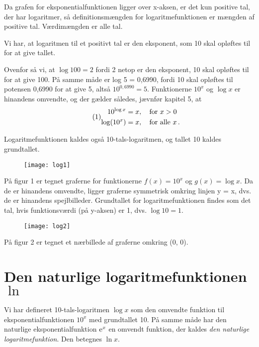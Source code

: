 \documentclass[12pt,oneside,a4paper]{article}
\theoremstyle{plain}
\begin{document}
Da grafen for eksponentialfunktionen ligger over x-aksen, er det kun positive
tal, der har logaritmer, så definitionsmængden for logaritmefunktionen er
mængden af positive tal. Værdimængden er alle tal.

Vi har, at logaritmen til et positivt tal er den eksponent, som 10 skal
opløftes til for at give tallet.

Ovenfor så vi, at $\log 100 = 2$ fordi 2 netop er den eksponent, 10 skal
opløftes til for at give 100. På samme måde er log 5 = 0,6990, fordi 10 skal
opløftes til potensen 0,6990 for at give 5, altså $10^{0,6990} = 5$.
Funktionerne $10^x$ og $\log x$ er hinandens omvendte, og der gælder således,
jævnfør kapitel 5, at
\[
    \tag{1}
    \begin{aligned}
        10^{\log x } &= x,\quad \text{for $x > 0$} \\
        \log (10^x) &= x,\quad \text{for alle $x$\,.}
    \end{aligned}
\]

Logaritmefunktionen kaldes også 10-tals-logaritmen, og tallet 10 kaldes grundtallet.

\begin{figure}[ht]
    \centering
    \texttt{[image: log1]}
    \caption{}
    \label{fig1}
\end{figure}

På figur 1 er tegnet graferne for funktionerne $f(x) = 10^x$ og $g(x) = \log x$. Da
de er hinandens omvendte, ligger graferne symmetrisk omkring linjen y = x, dvs.
de er hinandens spejlbilleder. Grundtallet for logaritmefunktionen findes som
det tal, hvis funktionsværdi (på y-aksen) er 1, dvs. $\log 10 = 1$.

\begin{figure}[ht]
    \centering
    \texttt{[image: log2]}
    \caption{}
    \label{fig2}
\end{figure}

På figur 2 er tegnet et nærbillede af graferne omkring (0, 0).

\section*{Den naturlige logaritmefunktionen $\ln$}
Vi har defineret 10-tals-logaritmen $\log x$ som den omvendte funktion til
eksponentialfunktionen $10^x$ med grundtallet 10. På samme måde har den
naturlige eksponentialfunktion ${\rm e}^x$ en omvendt funktion, der kaldes
{\em den naturlige logaritmefunktion}. Den betegnes $\ln x$.
\end{document}
